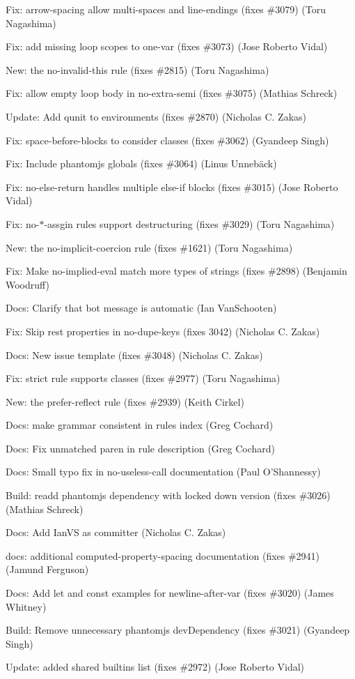 \begin{DoxyItemize}
\item Fix\+: {\ttfamily arrow-\/spacing} allow multi-\/spaces and line-\/endings (fixes \#3079) (Toru Nagashima)
\item Fix\+: add missing loop scopes to one-\/var (fixes \#3073) (Jose Roberto Vidal)
\item New\+: the {\ttfamily no-\/invalid-\/this} rule (fixes \#2815) (Toru Nagashima)
\item Fix\+: allow empty loop body in no-\/extra-\/semi (fixes \#3075) (Mathias Schreck)
\item Update\+: Add qunit to environments (fixes \#2870) (Nicholas C. Zakas)
\item Fix\+: {\ttfamily space-\/before-\/blocks} to consider classes (fixes \#3062) (Gyandeep Singh)
\item Fix\+: Include phantomjs globals (fixes \#3064) (Linus Unnebäck)
\item Fix\+: no-\/else-\/return handles multiple else-\/if blocks (fixes \#3015) (Jose Roberto Vidal)
\item Fix\+: {\ttfamily no-\/$\ast$-\/assgin} rules support destructuring (fixes \#3029) (Toru Nagashima)
\item New\+: the {\ttfamily no-\/implicit-\/coercion} rule (fixes \#1621) (Toru Nagashima)
\item Fix\+: Make no-\/implied-\/eval match more types of strings (fixes \#2898) (Benjamin Woodruff)
\item Docs\+: Clarify that bot message is automatic (Ian Van\+Schooten)
\item Fix\+: Skip rest properties in no-\/dupe-\/keys (fixes 3042) (Nicholas C. Zakas)
\item Docs\+: New issue template (fixes \#3048) (Nicholas C. Zakas)
\item Fix\+: strict rule supports classes (fixes \#2977) (Toru Nagashima)
\item New\+: the {\ttfamily prefer-\/reflect} rule (fixes \#2939) (Keith Cirkel)
\item Docs\+: make grammar consistent in rules index (Greg Cochard)
\item Docs\+: Fix unmatched paren in rule description (Greg Cochard)
\item Docs\+: Small typo fix in no-\/useless-\/call documentation (Paul O’\+Shannessy)
\item Build\+: readd phantomjs dependency with locked down version (fixes \#3026) (Mathias Schreck)
\item Docs\+: Add Ian\+VS as committer (Nicholas C. Zakas)
\item docs\+: additional computed-\/property-\/spacing documentation (fixes \#2941) (Jamund Ferguson)
\item Docs\+: Add let and const examples for newline-\/after-\/var (fixes \#3020) (James Whitney)
\item Build\+: Remove unnecessary phantomjs dev\+Dependency (fixes \#3021) (Gyandeep Singh)
\item Update\+: added shared builtins list (fixes \#2972) (Jose Roberto Vidal)
\end{DoxyItemize}


